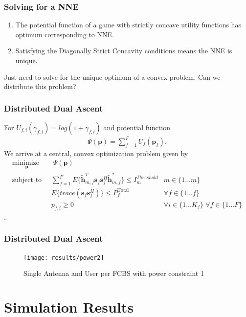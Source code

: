 \documentclass[10pt,tgadventor, onlymath]{beamer}
\begin{document}
\begin{frame}
\frametitle{Solving for a NNE}
\begin{enumerate}
\item
	The potential function of a game with strictly concave utility functions has optimum corresponding to NNE.
\item
	Satisfying the Diagonally Strict Concavity conditions means the NNE is unique.
\end{enumerate}
Just need to solve for the unique optimum of a convex problem. Can we distribute this problem?
\end{frame}

\begin{frame}
\frametitle{Distributed Dual Ascent}
For $U_{f,i}(\gamma_{f,i}) = log(1+\gamma_{f,i})$ and potential function
\begin{gather*} \label{Potential_Function}
\Psi(\mathbf{p}) = \sum_{f = 1}^{F} U_{f}(\mathbf{p}_{f}).
\end{gather*}
We arrive at a central, convex optimization problem given by
		\begin{subequations}
	\label{optim}
	\begin{align}
	    \underset{\mathbf{p}}{\text{minimize  }}
	    & \; \Psi(\mathbf{p}) \label{potential_game} \\
	    \text{subject to  } \; &
	  \sum^F_{f=1} E\{\tilde{\mathbf{h}}_{m,f}^T  \mathbf{s}_{f} 						
	\mathbf{s}_{f}^{H} \tilde{\mathbf{h}}_{m,f}^* \}\leq I^{Threshold}		
	_{m} & m \in \{1 ...m\} 
		\label{interference_const}\\
        & E\{trace(\mathbf{s}_f\mathbf{s}_f^H)\}  \leq P_{f}^{\text{Total}}  \label{power_const}
        & \forall f \in \{1 ... f\}\\
        & p_{f,i} \geq 0 &  \forall i \in \{1 ...K_{f}\} \; \forall f \in \{1 ... F\}\label{pos_power_const}
	\end{align}
	\end{subequations}.
\end{frame}

\begin{frame}
\frametitle{Distributed Dual Ascent}
\begin{figure}
	\texttt{[image: results/power2]}
\caption{Single Antenna and User per FCBS with power constraint 1}
\end{figure}

\end{frame}

\section{Simulation Results}
\end{document}
